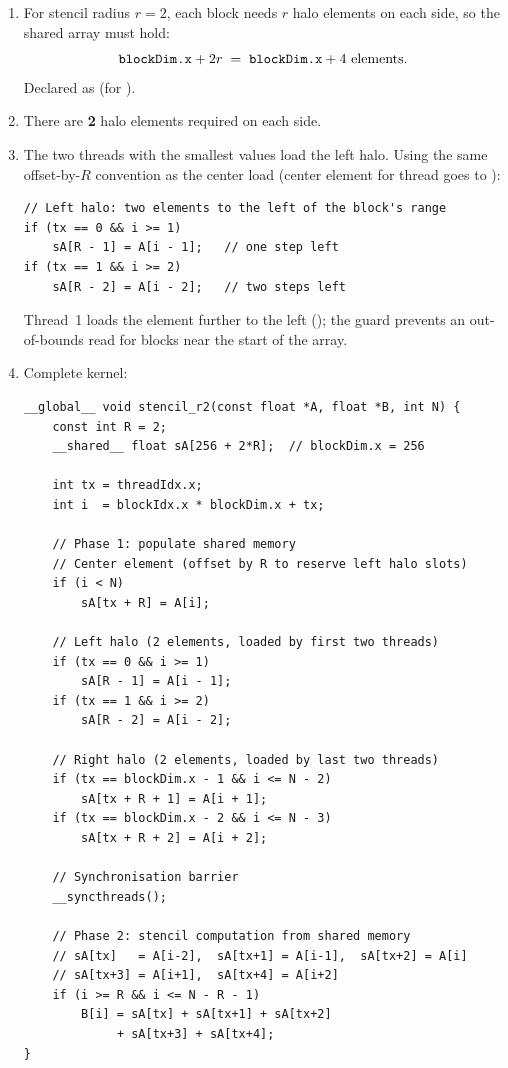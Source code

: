 \begin{enumerate}[label=(\alph*)]
  \item For stencil radius $r = 2$, each block needs $r$ halo elements on
        each side, so the shared array must hold:
        \[
          \texttt{blockDim.x} + 2r \;=\; \texttt{blockDim.x} + 4 \text{ elements.}
        \]
        Declared as  (for
        ).

  \item There are \textbf{2} halo elements required on each side.

  \item The two threads with the smallest  values load the left
        halo.  Using the same offset-by-$R$ convention as the center load
        (center element for thread  goes to ):
\begin{lstlisting}
// Left halo: two elements to the left of the block's range
if (tx == 0 && i >= 1)
    sA[R - 1] = A[i - 1];   // one step left
if (tx == 1 && i >= 2)
    sA[R - 2] = A[i - 2];   // two steps left
\end{lstlisting}
        Thread~1 loads the element further to the left ();
        the guard  prevents an out-of-bounds read for blocks
        near the start of the array.

  \item Complete kernel:
\begin{lstlisting}
__global__ void stencil_r2(const float *A, float *B, int N) {
    const int R = 2;
    __shared__ float sA[256 + 2*R];  // blockDim.x = 256

    int tx = threadIdx.x;
    int i  = blockIdx.x * blockDim.x + tx;

    // Phase 1: populate shared memory
    // Center element (offset by R to reserve left halo slots)
    if (i < N)
        sA[tx + R] = A[i];

    // Left halo (2 elements, loaded by first two threads)
    if (tx == 0 && i >= 1)
        sA[R - 1] = A[i - 1];
    if (tx == 1 && i >= 2)
        sA[R - 2] = A[i - 2];

    // Right halo (2 elements, loaded by last two threads)
    if (tx == blockDim.x - 1 && i <= N - 2)
        sA[tx + R + 1] = A[i + 1];
    if (tx == blockDim.x - 2 && i <= N - 3)
        sA[tx + R + 2] = A[i + 2];

    // Synchronisation barrier
    __syncthreads();

    // Phase 2: stencil computation from shared memory
    // sA[tx]   = A[i-2],  sA[tx+1] = A[i-1],  sA[tx+2] = A[i]
    // sA[tx+3] = A[i+1],  sA[tx+4] = A[i+2]
    if (i >= R && i <= N - R - 1)
        B[i] = sA[tx] + sA[tx+1] + sA[tx+2]
             + sA[tx+3] + sA[tx+4];
}
\end{lstlisting}
\end{enumerate}



